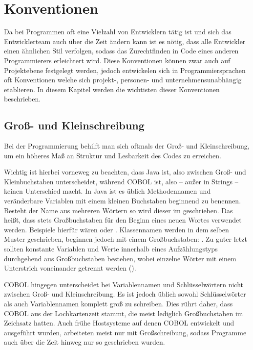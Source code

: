\section{Konventionen}
Da bei Programmen oft eine Vielzahl von Entwicklern tätig ist und sich das Entwicklerteam auch über die Zeit ändern kann ist es nötig, dass alle Entwickler einen ähnlichen Stil verfolgen, sodass das Zurechtfinden in Code eines anderen Programmierers erleichtert wird. Diese Konventionen können zwar auch auf Projektebene festgelegt werden, jedoch entwickelen sich in Programmiersprachen oft Konventionen welche sich projekt-, personen- und unternehmensunabhängig etablieren. In diesem Kapitel werden die wichtisten dieser Konventionen beschrieben.

\subsection{Groß- und Kleinschreibung}
Bei der Programmierung behilft man sich oftmals der Groß- und Kleinschreibung, um ein höheres Maß an Struktur und Lesbarkeit des Codes zu erreichen.

Wichtig ist hierbei vorneweg zu beachten, dass Java  ist, also zwischen Groß- und Kleinbuchstaben unterscheidet, während COBOL  ist, also -- außer in Strings -- keinen Unterschied macht.
In Java ist es üblich Methodennamen und veränderbare Variablen mit einem kleinen Buchstaben beginnend zu benennen. Besteht der Name aus mehreren Wörtern so wird dieser im  geschrieben. Das heißt, dass stets Großbuchstaben für den Beginn eines neuen Wortes verwendet werden. Beispiele hierfür wären  oder . Klassennamen werden in dem selben Muster geschrieben, beginnen jedoch mit einem Großbuchstaben: . Zu guter letzt sollten konstante Variablen und Werte innerhalb eines Aufzählungstyps durchgehend aus Großbuchstaben bestehen, wobei einzelne Wörter mit einem Unterstrich voneinander getrennt werden (). 

COBOL hingegen unterscheidet bei Variablennamen und Schlüsselwörtern nicht zwischen Groß- und Kleinschreibung. Es ist jedoch üblich sowohl Schlüsselwörter als auch Variablennamen komplett groß zu schreiben. Dies rührt daher, dass COBOL aus der Lochkartenzeit stammt, die meist lediglich Großbuchstaben im Zeichsatz hatten. Auch frühe Hostsysteme auf denen COBOL entwickelt und ausgeführt wurden, arbeiteten meist nur mit Großschreibung, sodass Programme auch über die Zeit hinweg nur so geschrieben wurden.


